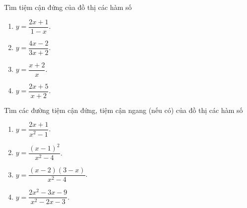 \begin{bt}%
Tìm tiệm cận đứng của đồ thị các hàm số
\begin{multicols}{4}
\begin{enumerate}
	\item $y=\dfrac{2x+1}{1-x}$.
	\item $y=\dfrac{4x-2}{3x+2}$.
	\item $y=\dfrac{x+2}{x}$.
	\item $y=\dfrac{2x+5}{x+2}$.
\end{enumerate}
\end{multicols}
\end{bt}

\begin{bt}%
Tìm các đường tiệm cận đứng, tiệm cận ngang (nếu có) của đồ thị các hàm số
\begin{multicols}{2}
\begin{enumerate}
	\item $y=\dfrac{2x+1}{x^2-1}$.
	\item $y=\dfrac{(x-1)^2}{x^2-4}$.
	\item $y=\dfrac{(x-2)(3-x)}{x^2-4}$.
	\item $y=\dfrac{2x^2-3x-9}{x^2-2x-3}$.
\end{enumerate}
\end{multicols}
\end{bt}

